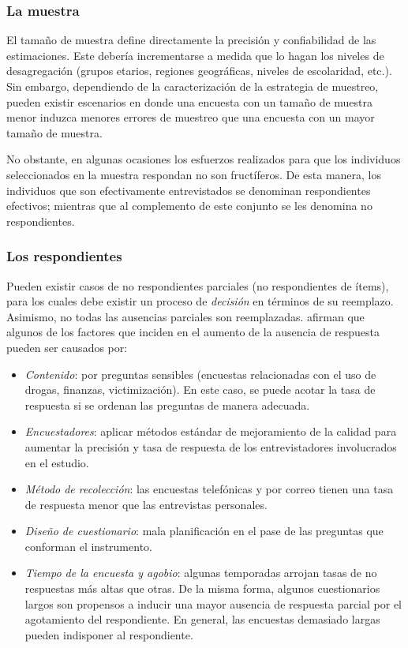 \documentclass[
  12pt,
  spanish,
]{book}
\providecommand{\tightlist}{%
  \setlength{\itemsep}{0pt}\setlength{\parskip}{0pt}}
\begin{document}
\hypertarget{la-muestra}{%
\subsubsection{La muestra}\label{la-muestra}}

El tamaño de muestra define directamente la precisión y confiabilidad de las estimaciones. Este debería incrementarse a medida que lo hagan los niveles de desagregación (grupos etarios, regiones geográficas, niveles de escolaridad, etc.). Sin embargo, dependiendo de la caracterización de la estrategia de muestreo, pueden existir escenarios en donde una encuesta con un tamaño de muestra menor induzca menores errores de muestreo que una encuesta con un mayor tamaño de muestra.

No obstante, en algunas ocasiones los esfuerzos realizados para que los individuos seleccionados en la muestra respondan no son fructíferos. De esta manera, los individuos que son efectivamente entrevistados se denominan respondientes efectivos; mientras que al complemento de este conjunto se les denomina no respondientes.

\hypertarget{los-respondientes}{%
\subsubsection{Los respondientes}\label{los-respondientes}}

Pueden existir casos de no respondientes parciales (no respondientes de ítems), para los cuales debe existir un proceso de \emph{decisión} en términos de su reemplazo. Asimismo, no todas las ausencias parciales son reemplazadas. \citet{Groves_Fowler_Couper_Lepkowski_Singer_Tourangeau_2009} afirman que algunos de los factores que inciden en el aumento de la ausencia de respuesta pueden ser causados por:

\begin{itemize}
\tightlist
\item
  \emph{Contenido}: por preguntas sensibles (encuestas relacionadas con el uso de drogas, finanzas, victimización). En este caso, se puede acotar la tasa de respuesta si se ordenan las preguntas de manera adecuada.
\item
  \emph{Encuestadores}: aplicar métodos estándar de mejoramiento de la calidad para aumentar la precisión y tasa de respuesta de los entrevistadores involucrados en el estudio.
\item
  \emph{Método de recolección}: las encuestas telefónicas y por correo tienen una tasa de respuesta menor que las entrevistas personales.
\item
  \emph{Diseño de cuestionario}: mala planificación en el pase de las preguntas que conforman el instrumento.
\item
  \emph{Tiempo de la encuesta y agobio}: algunas temporadas arrojan tasas de no respuestas más altas que otras. De la misma forma, algunos cuestionarios largos son propensos a inducir una mayor ausencia de respuesta parcial por el agotamiento del respondiente. En general, las encuestas demasiado largas pueden indisponer al respondiente.
\end{itemize}
\end{document}
